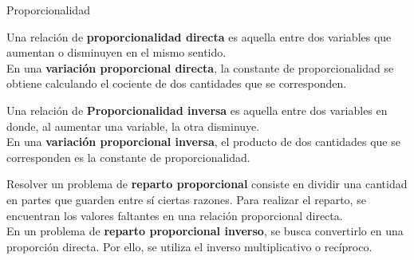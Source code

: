 
\begin{infocard}{Proporcionalidad}

    Una relación de \textbf{proporcionalidad directa} es aquella entre dos variables que aumentan o disminuyen en el mismo sentido.\\

    En una \textbf{variación proporcional directa}, la constante de proporcionalidad se obtiene
    calculando el cociente de dos cantidades que se corresponden.

    \DrawLine

    Una relación de \textbf{Proporcionalidad inversa}  es aquella entre dos variables en donde, al aumentar una variable, la otra disminuye.\\

    En una \textbf{variación proporcional inversa}, el producto de dos cantidades que se
    corresponden es la constante de proporcionalidad.


    \DrawLine

    Resolver un problema de \textbf{reparto proporcional} consiste en dividir una cantidad en
    partes que guarden entre sí ciertas razones. Para realizar el reparto, se encuentran
    los valores faltantes en una relación proporcional directa.\\

    En un problema de \textbf{reparto proporcional inverso}, se busca convertirlo en una proporción directa. Por ello, se utiliza el inverso multiplicativo o recíproco.

\end{infocard}



